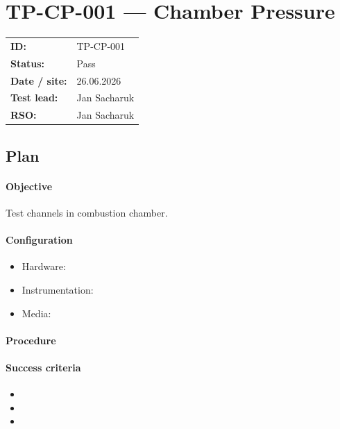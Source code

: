 \section{TP-CP-001 --- Chamber Pressure}

\begin{tabular}{@{}ll@{}}
\textbf{ID:} & TP-CP-001 \\
\textbf{Status:} & Pass \\
\textbf{Date / site:} & 26.06.2026 \\
\textbf{Test lead:} & Jan Sacharuk \\
\textbf{RSO:} & Jan Sacharuk \\
\end{tabular}

\subsection*{Plan}

\paragraph{Objective}
Test channels in combustion chamber.

\paragraph{Configuration}
\begin{itemize}
  \item Hardware: 
  \item Instrumentation: 
  \item Media: 
\end{itemize}

\paragraph{Procedure}

\paragraph{Success criteria}
\begin{itemize}
  \item {}
  \item {}
  \item {}
\end{itemize}

